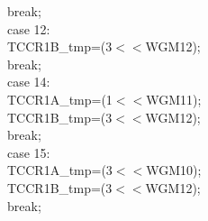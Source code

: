 \documentclass[titlepage, a4paper, 10pt, reqno, openany]{report}
\begin{document}
\begin{minipage}[t]{.35\linewidth}
\hspace*{1.5cm}			break; \\
\hspace*{1cm}		case 12: \\
\hspace*{1.5cm}			TCCR1B\_tmp=(3$<<$WGM12); \\
\hspace*{1.5cm}			break; \\
\hspace*{1cm}		case 14: \\
\hspace*{1.5cm}			TCCR1A\_tmp=(1$<<$WGM11); \\
\hspace*{1.5cm}			TCCR1B\_tmp=(3$<<$WGM12); \\
\hspace*{1.5cm}			break; \\
\hspace*{1cm}		case 15: \\
\hspace*{1.5cm}			TCCR1A\_tmp=(3$<<$WGM10); \\
\hspace*{1.5cm}			TCCR1B\_tmp=(3$<<$WGM12); \\
\hspace*{1.5cm}			break;
\end{minipage}
\vline \quad
\end{document}
